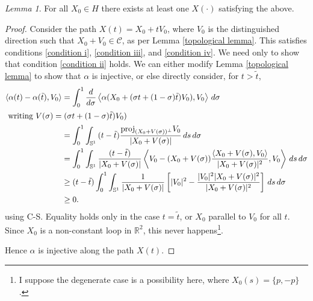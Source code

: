 \documentclass[12pt, a4paper]{amsart}
\theoremstyle{remark}
\newtheorem{lemma}{Lemma}
\newcommand{\R}{\mathbb{R}}
\newcommand{\So}{\mathbb{S}^1}
\begin{document}
\begin{lemma}
For all $X_0\in H$ there exists at least one $X(\cdot)$ satisfying the above.   
\end{lemma}
\begin{proof}
Consider the path $X(t)=X_0+tV_0$, where $V_0$ is the distinguished direction such that $X_0+V_0\in\mathcal{C}$, as per Lemma \ref{topological lemma}.   This satisfies conditions \ref{condition i}, \ref{condition iii}, and \ref{condition iv}.   We need only to show that condition \ref{condition ii} holds.    We can either modify Lemma  \ref{topological lemma} to show that $\alpha$ is injective, or else directly consider, for $t>\tilde{t}$,
\begin{align*}
\langle \alpha(t)-\alpha(\tilde{t}), V_0\rangle 
&=\int_0^1 \dfrac{d}{d\sigma} \left\langle \alpha(X_0+(\sigma t+ (1-\sigma)\tilde{t})V_0), V_0\right\rangle \,d\sigma \\
\intertext{ writing $V(\sigma)=(\sigma t+ (1-\sigma)\tilde{t})V_0)$}
&= \int_0^1 \int_{\So} %
 {(t-\tilde{t})}      \frac{ \text{proj}_{(X_0+ V(\sigma))^\perp} V_0}{|X_0+ V(\sigma)|} \,ds\,d\sigma  \\
 &= \int_0^1 \int_{\So} %
     \frac{ {(t-\tilde{t})} }{{|X_0+ V(\sigma)|}}
 \left\langle V_0-  (X_0+ V(\sigma)) \frac{ \langle X_0+V(\sigma), V_0\rangle }{ |X_0+V(\sigma)|^2},V_0\right\rangle \,ds\,d\sigma \\
 &\ge (t-\tilde{t}) \int_0^1 \int_{\So} %
     \frac{ 1}{{|X_0+ V(\sigma)|}}
\left[ |V_0|^2 - \frac{|V_0|^2 |X_0+V(\sigma)|^2}{|X_0+V(\sigma)|^2}\right] \,ds\,d\sigma \\
&\ge 0.
\end{align*}
{using C-S}. Equality holds only in the case $t=\tilde{t}$, or $X_0$ parallel to $V_0$ for all $t$.  Since $X_0$ is a non-constant loop in $\R^2$, this never happens\footnote{I suppose the degenerate case is a possibility here, where $X_0(s)=\lbrace p,-p\rbrace$.}.  

Hence $\alpha$ is injective along the path $X(t)$.




\end{proof}
\end{document}
